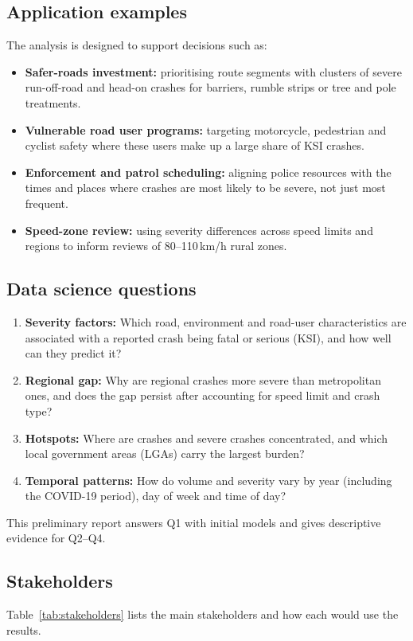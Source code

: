 \documentclass[11pt,a4paper]{article}
\begin{document}
\subsection{Application examples}
The analysis is designed to support decisions such as:
\begin{itemize}
  \item \textbf{Safer-roads investment:} prioritising route segments with clusters of severe run-off-road and
        head-on crashes for barriers, rumble strips or tree and pole treatments.
  \item \textbf{Vulnerable road user programs:} targeting motorcycle, pedestrian and cyclist safety where
        these users make up a large share of KSI crashes.
  \item \textbf{Enforcement and patrol scheduling:} aligning police resources with the times and places where
        crashes are most likely to be severe, not just most frequent.
  \item \textbf{Speed-zone review:} using severity differences across speed limits and regions to inform
        reviews of 80--110\,km/h rural zones.
\end{itemize}

\subsection{Data science questions}
\begin{enumerate}[label=\textbf{Q\arabic*.}]
  \item \textbf{Severity factors:} Which road, environment and road-user characteristics are associated with a
        reported crash being fatal or serious (KSI), and how well can they predict it?
  \item \textbf{Regional gap:} Why are regional crashes more severe than metropolitan ones, and does the gap
        persist after accounting for speed limit and crash type?
  \item \textbf{Hotspots:} Where are crashes and severe crashes concentrated, and which local government areas
        (LGAs) carry the largest burden?
  \item \textbf{Temporal patterns:} How do volume and severity vary by year (including the COVID-19 period),
        day of week and time of day?
\end{enumerate}
This preliminary report answers Q1 with initial models and gives descriptive evidence for Q2--Q4.

\subsection{Stakeholders}
Table~\ref{tab:stakeholders} lists the main stakeholders and how each would use the results.
\end{document}
